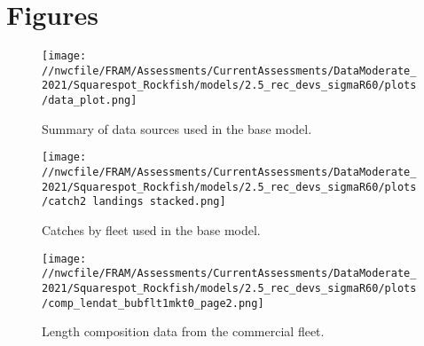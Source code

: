 \documentclass[11pt,
  english,
  a4paper,
]{article}
\begin{document}
\newpage

\clearpage


\hypertarget{figures}{%
\section{Figures}\label{figures}}

\leavevmode\tagmcend\tagstructend


\begin{figure}
\centering
\texttt{[image: //nwcfile/FRAM/Assessments/CurrentAssessments/DataModerate\_2021/Squarespot\_Rockfish/models/2.5\_rec\_devs\_sigmaR60/plots/data\_plot.png]}
\caption{Summary of data sources used in the base model.\label{fig:data-plot}}
\end{figure}

\tagmcend\tagstructend


\begin{figure}
\centering
\texttt{[image: //nwcfile/FRAM/Assessments/CurrentAssessments/DataModerate\_2021/Squarespot\_Rockfish/models/2.5\_rec\_devs\_sigmaR60/plots/catch2 landings stacked.png]}
\caption{Catches by fleet used in the base model.\label{fig:catch}}
\end{figure}

\tagmcend\tagstructend


\begin{figure}
\centering
\texttt{[image: //nwcfile/FRAM/Assessments/CurrentAssessments/DataModerate\_2021/Squarespot\_Rockfish/models/2.5\_rec\_devs\_sigmaR60/plots/comp\_lendat\_bubflt1mkt0\_page2.png]}
\caption{Length composition data from the commercial fleet.\label{fig:com-len-data}}
\end{figure}

\tagmcend\tagstructend

\end{document}
